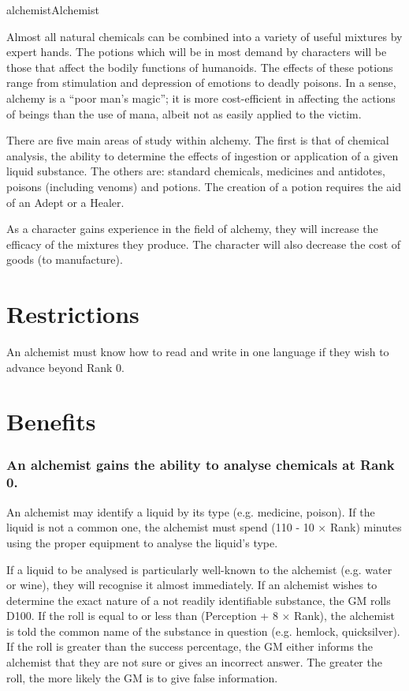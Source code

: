 \begin{Skill}[1.1]{alchemist}{Alchemist}

Almost all natural chemicals can be combined into a variety of useful
mixtures by expert hands.  The potions which will be in most demand by
characters will be those that affect the bodily functions of
humanoids. The effects of these potions range from stimulation and
depression of emotions to deadly poisons.  In a sense, alchemy is a
“poor man’s magic”; it is more cost-efficient in affecting the actions
of beings than the use of mana, albeit not as easily applied to the
victim.

There are five main areas of study within alchemy.  The first is that
of chemical analysis, the ability to determine the effects of
ingestion or application of a given liquid substance.  The others are:
standard chemicals, medicines and antidotes, poisons (including
venoms) and potions.  The creation of a potion requires the aid of an
Adept or a Healer.

As a character gains experience in the field of alchemy, they will
increase the efficacy of the mixtures they produce.  The character
will also decrease the cost of goods (to manufacture).

\section{Restrictions}

An alchemist must know how to read and write in one language if they
wish to advance beyond Rank 0.

\section{Benefits}

\subsubsection{An alchemist gains the ability to analyse chemicals at Rank 0.}

An alchemist may identify a liquid by its type (e.g.  medicine,
poison).  If the liquid is not a common one, the alchemist must spend
(110 - 10 × Rank) minutes using the proper equipment to analyse the
liquid’s type.

If a liquid to be analysed is particularly well-known to the alchemist
(e.g.  water or wine), they will recognise it almost immediately.  If
an alchemist wishes to determine the exact nature of a not readily
identifiable substance, the GM rolls D100.  If the roll is equal to or
less than (Perception + 8 × Rank), the alchemist is told the common
name of the substance in question (e.g. hemlock, quicksilver).  If the
roll is greater than the success percentage, the GM either informs the
alchemist that they are not sure or gives an incorrect answer.  The
greater the roll, the more likely the GM is to give false information.


\end{Skill}
